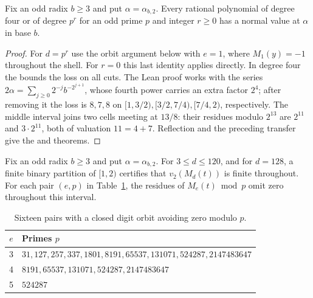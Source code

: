 \documentclass[11pt]{article}
\begin{document}
\begin{theorem}\label{special}
Fix an odd radix \(b\ge3\) and put \(\alpha=\alpha_{b,2}\).
Every rational polynomial of degree four or of degree \(p^r\) for an odd
prime \(p\) and integer \(r\ge0\) has a normal value at \(\alpha\) in
base \(b\). 
\end{theorem}
\begin{proof}
For \(d=p^r\) use the orbit argument below with \(e=1\), where
\(M_1(y)=-1\) throughout the shell. For \(r=0\) this last identity applies
directly. In degree four the  bounds the loss on all cuts. The Lean proof works with the
series \(2\alpha=\sum_{j\ge0}2^{-j}b^{-2^{j+1}}\), whose fourth power
carries an extra factor \(2^4\); after removing it the loss is \(8,7,8\) on
\([1,3/2),[3/2,7/4),[7/4,2)\), respectively. The middle interval
joins two cells meeting at \(13/8\): their residues modulo \(2^{13}\)
are \(2^{11}\) and \(3\cdot2^{11}\), both of valuation \(11=4+7\). Reflection and the preceding
transfer give the  and
 theorems.
\end{proof}

\begin{proposition}\label{finite}
Fix an odd radix \(b\ge3\) and put \(\alpha=\alpha_{b,2}\).
For \(3\le d\le120\), and for \(d=128\), a finite binary partition of
\([1,2)\) certifies that \(v_2(M_d(t))\) is finite throughout.
For each pair \((e,p)\) in Table~\ref{pairs}, the residues of
\(M_e(t)\bmod p\) omit zero throughout this interval.
\end{proposition}

\begin{table}[ht]
\centering
\begin{tabular}{cl}
\toprule \(e\)&Primes \(p\)\\ \midrule
3 & \(31,127,257,337,1801,8191,65537,131071,524287,2147483647\)\\
4 & \(8191,65537,131071,524287,2147483647\)\\
5 & \(524287\)\\ \bottomrule
\end{tabular}
\caption{Sixteen pairs with a closed digit orbit avoiding zero modulo \(p\).}
\label{pairs}
\end{table}
\end{document}
